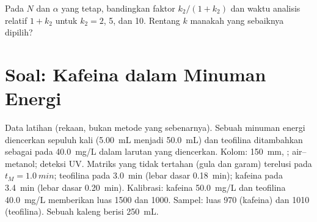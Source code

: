 \begin{exercise}[$\star\star\star$]\label{exo:b2:chromatography:12}
Pada $N$ dan $\alpha$ yang tetap, bandingkan faktor  $k_2/(1+k_2)$
dan waktu analisis relatif $1 + k_2$ untuk $k_2 = 2$, 5, dan 10. Rentang $k$
manakah yang sebaiknya dipilih?
\end{exercise}

\section{Soal: Kafeina dalam Minuman Energi}

\begin{problem}
\label{pb:b2:chromatography:1}
Data latihan (rekaan, bukan metode yang sebenarnya). Sebuah minuman energi
diencerkan sepuluh kali (\qty{5.00}{mL} menjadi
\qty{50.0}{mL}) dan teofilina ditambahkan sebagai  pada
\qty{40.0}{mg/L} dalam larutan yang diencerkan. Kolom: \qty{150}{mm}, ;  air--metanol; deteksi UV. Matriks yang tidak tertahan
(gula dan garam) terelusi pada $t_M = \qty{1.0}{min}$; teofilina pada
\qty{3.0}{min} (lebar dasar \qty{0.18}{min}); kafeina pada \qty{3.4}{min} (lebar dasar \qty{0.20}{min}).
Kalibrasi: kafeina \qty{50.0}{mg/L} dan teofilina \qty{40.0}{mg/L}
memberikan luas 1500 dan 1000. Sampel: luas 970 (kafeina) dan 1010
(teofilina). Sebuah kaleng berisi \qty{250}{mL}.

\begin{center}
\end{center}


\end{problem}
